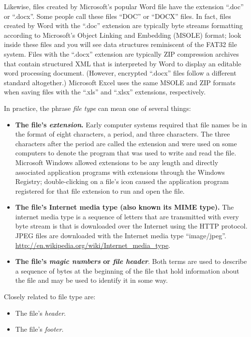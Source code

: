 Likewise, files created by Microsoft's popular Word file have the
extension ``.doc'' or ``.docx''. Some people call these files ``DOC''
or ``DOCX'' files. In fact, files created by Word with the ``.doc''
extension are typically byte streams formatting according to Microsoft's Object Linking and
Embedding (MSOLE) format; look inside these files and you will see data
structures reminiscent of the FAT32 file system. Files with the ``.docx'' extension are
typically ZIP compression archives that contain structured XML that is
interpreted by Word to display an editable word processing
document. (However, encrypted ``.docx'' files follow a different
standard altogether.)
Microsoft Excel uses the same MSOLE and ZIP formats when saving files
with the ``.xls'' and ``.xlsx'' extensions, respectively.

In practice, the phrase \emph{file type} can mean one of several things:

\begin{itemize}
\item \textbf{The file's \emph{extension}.} Early computer systems
  required that file names be in the format of eight characters, a
  period, and three characters. The three characters after the period
  are called the extension and were used on some computers to denote
  the program that was used to write and read the file. Microsoft
  Windows allowed extensions to be any length and directly associated
  application programs with extensions through the Windows Registry;
  double-clicking on a file's icon caused the application program
  registered for that file extension to run and open the file.
\item \textbf{The file's Internet media type (also known its MIME
  type).} The internet media type is a sequence of letters that are
  transmitted with every byte stream is that is downloaded over the
  Internet using the HTTP protocol. JPEG files are downloaded with the
  Internet media type ``image/jpeg''. \url{http://en.wikipedia.org/wiki/Internet_media_type}. 
\item \textbf{The file's \emph{magic numbers} or \emph{file
    header}}. Both terms are used to describe a sequence of bytes at the
  beginning of the file that hold information about the file and may
  be used to identify it in some way.
\end{itemize}

Closely related to file type are:
\begin{itemize}
\item The file's \emph{header}.
\item The file's \emph{footer}.
\end{itemize}

